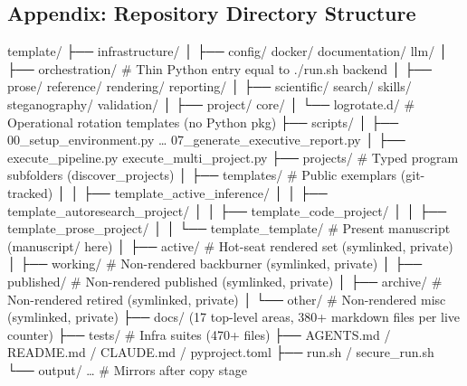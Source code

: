 \documentclass[
]{article}
\newenvironment{Shaded}{}{}
\newcommand{\NormalTok}[1]{#1}
\begin{document}
\newpage

\newpage

\subsection{Appendix: Repository Directory
Structure}\label{appendix-directory}

\begin{Shaded}
\begin{Highlighting}[]
\NormalTok{template/}
\NormalTok{├── infrastructure/}
\NormalTok{│   ├── config/ docker/ documentation/ llm/}
\NormalTok{│   ├── orchestration/   \# Thin Python entry equal to \textasciigrave{}./run.sh\textasciigrave{} backend}
\NormalTok{│   ├── prose/ reference/ rendering/ reporting/}
\NormalTok{│   ├── scientific/ search/ skills/ steganography/ validation/}
\NormalTok{│   ├── project/ core/}
\NormalTok{│   └── logrotate.d/      \# Operational rotation templates (no Python pkg)}
\NormalTok{├── scripts/}
\NormalTok{│   ├── 00\_setup\_environment.py … 07\_generate\_executive\_report.py}
\NormalTok{│   ├── execute\_pipeline.py execute\_multi\_project.py}
\NormalTok{├── projects/                    \# Typed program subfolders (\textasciigrave{}discover\_projects\textasciigrave{})}
\NormalTok{│   ├── templates/               \# Public exemplars (git{-}tracked)}
\NormalTok{│   │   ├── template\_active\_inference/}
\NormalTok{│   │   ├── template\_autoresearch\_project/}
\NormalTok{│   │   ├── template\_code\_project/}
\NormalTok{│   │   ├── template\_prose\_project/}
\NormalTok{│   │   └── template\_template/   \# Present manuscript (\textasciigrave{}manuscript/\textasciigrave{} here)}
\NormalTok{│   ├── active/                  \# Hot{-}seat rendered set (symlinked, private)}
\NormalTok{│   ├── working/                 \# Non{-}rendered backburner (symlinked, private)}
\NormalTok{│   ├── published/               \# Non{-}rendered published (symlinked, private)}
\NormalTok{│   ├── archive/                 \# Non{-}rendered retired (symlinked, private)}
\NormalTok{│   └── other/                   \# Non{-}rendered misc (symlinked, private)}
\NormalTok{├── docs/ (17 top{-}level areas, 380+ markdown files per live counter)}
\NormalTok{├── tests/                       \# Infra suites (470+ files)}
\NormalTok{├── AGENTS.md / README.md / CLAUDE.md / pyproject.toml}
\NormalTok{├── run.sh / secure\_run.sh}
\NormalTok{└── output/ …                    \# Mirrors after copy stage}
\end{Highlighting}
\end{Shaded}
\end{document}
